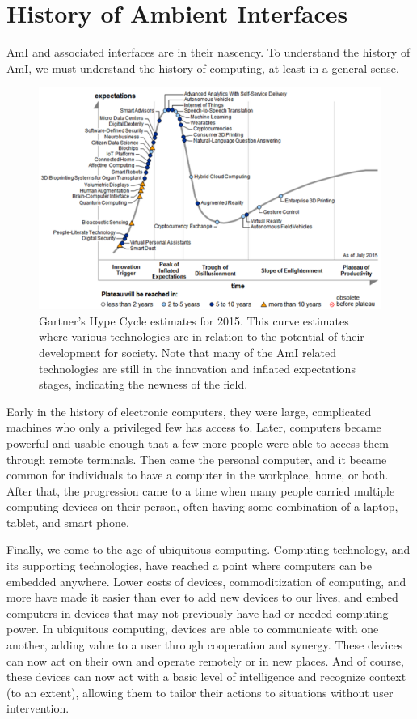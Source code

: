\documentclass{article}
\begin{document}
%
%
\section{History of Ambient Interfaces}
AmI and associated interfaces are in their nascency. To understand the history of AmI, we must understand the history of computing, at least in a general sense.

\begin{figure}
  \begin{center}
    \includegraphics[width=.8\linewidth]{hype}
  \end{center}
  \caption{Gartner's Hype Cycle estimates for 2015. This curve estimates where various technologies are in relation to the potential of their development for society. Note that many of the AmI related technologies are still in the innovation and inflated expectations stages, indicating the newness of the field. \cite{gartner}}
  \label{hype}
\end{figure}

Early in the history of electronic computers, they were large, complicated machines who only a privileged few has access to. Later, computers became powerful and usable enough that a few more people were able to access them through remote terminals. Then came the personal computer, and it became common for individuals to have a computer in the workplace, home, or both. After that, the progression came to a time when many people carried multiple computing devices on their person, often having some combination of a laptop, tablet, and smart phone.\cite{Cook2009277}

Finally, we come to the age of ubiquitous computing. Computing technology, and its supporting technologies, have reached a point where computers can be embedded anywhere. Lower costs of devices, commoditization of computing, and more have made it easier than ever to add new devices to our lives, and embed computers in devices that may not previously have had or needed computing power. In ubiquitous computing, devices are able to communicate with one another, adding value to a user through cooperation and synergy. These devices can now act on their own and operate remotely or in new places. And of course, these devices can now act with a basic level of intelligence and recognize context (to an extent), allowing them to tailor their actions to situations without user intervention.
\end{document}
